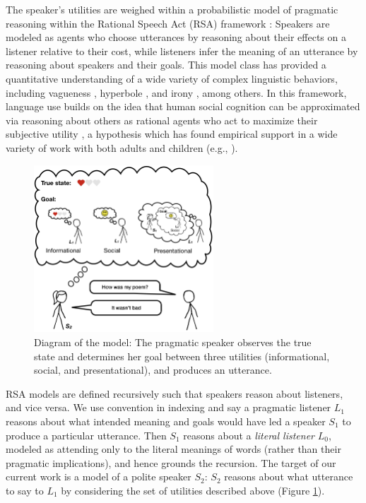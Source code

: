 \documentclass[9pt,twocolumn,twoside,lineno]{main_class_file}
\begin{document}
The speaker's utilities are weighed within a probabilistic model of pragmatic reasoning within the Rational Speech Act (RSA) framework \cite{frank2012, goodman2016}: Speakers are modeled as
agents who choose utterances by reasoning about their effects on a
listener relative to their cost, while listeners infer the meaning of an utterance by reasoning about speakers and their goals.
This model class has provided a quantitative understanding of a wide variety of complex linguistic behaviors, including vagueness \cite{lassiter2017adjectival}, hyperbole \cite{kao2014}, and irony
\cite{kao2015}, among others. 
In this framework, language use builds on the idea that human social cognition can
be approximated via reasoning about others as rational agents who act to
maximize their subjective utility \cite{baker2009action}, a
hypothesis which has found empirical support in a wide variety of work with both
adults and children (e.g., \cite{jara2016naive, liu2017ten}).
 
\begin{figure}[!h]
\includegraphics[width=0.6\textwidth]{fig/model} \centering \caption{Diagram of the model: The pragmatic speaker observes the true state and determines her goal between three utilities (informational, social, and presentational), and produces an utterance.}\label{fig:model}
\end{figure}

RSA models are defined recursively such that speakers reason about
listeners, and vice versa. We use convention in indexing and say a pragmatic listener \(L_1\) reasons about what intended meaning
and goals would have led a speaker \(S_1\) to produce a particular
utterance. Then \(S_1\) reasons about a \emph{literal listener}
\(L_0\), modeled as attending only to the literal meanings of words
(rather than their pragmatic implications), and hence grounds the
recursion. 
The target of our current work is a model of a polite speaker
\(S_2\): \(S_2\) reasons about what utterance to say to \(L_1\) by
considering the set of utilities described above (Figure
\ref{fig:model}).
\end{document}

